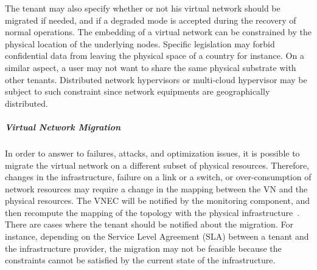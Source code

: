 The tenant may also specify whether or not his virtual network should be migrated if needed, and if a degraded mode is accepted during the recovery of normal operations.
The embedding of a virtual network can be constrained by the physical location of the underlying nodes.
Specific legislation may forbid confidential data from leaving the physical space of a country for instance.
On a similar aspect, a user may not want to share the same physical substrate with other tenants.
Distributed network hypervisors or multi-cloud hypervisor may be subject to such constraint since network equipments are geographically distributed.



\subparagraph{Virtual Network Migration}
In order to answer to failures, attacks, and optimization issues, it is possible to migrate the virtual network on a different subset of physical resources. 
Therefore, changes in the infrastructure, failure on a link or a switch, or over-consumption of network resources may require a change in the mapping between the VN and the physical resources.
The VNEC will be notified by the monitoring component, and then recompute the mapping of the topology with the physical infrastructure~\cite{VeRTIGO-Corin2012a,AutoSlice-Bozakov2012,CoVisor-Jin2015}.
There are cases where the tenant should be notified about the migration.
For instance, depending on the Service Level Agreement (SLA) between a tenant and the infrastructure provider, the migration may not be feasible because the constraints cannot be satisfied by the current state of the infrastructure.

